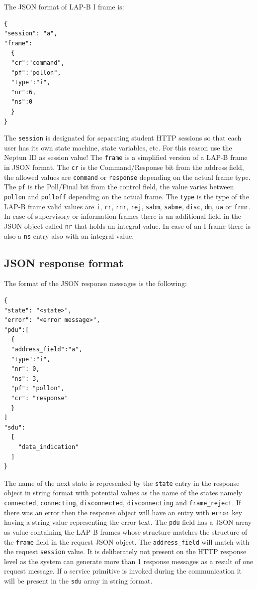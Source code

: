 \documentclass[a4paper]{article}
\begin{document}
The JSON format of LAP-B I frame is:
\begin{verbatim}
{
"session": "a", 
"frame": 
  {
  "cr":"command",
  "pf":"pollon",
  "type":"i",
  "nr":6,
  "ns":0
  }
}
\end{verbatim}

The \verb!session! is designated for separating student HTTP sessions so that each user has its own state
machine, state variables, etc. For this reason use the Neptun ID as session value!  The \verb!frame! is
a simplified version of a LAP-B
frame in JSON format. The \verb!cr! is the Command/Response bit from the address field, the allowed
values are \verb!command! or \verb!response! depending on the actual frame type. The
\verb!pf! is the Poll/Final bit from the control field, the value varies between
\verb!pollon! and \verb!polloff! depending on the actual frame. The
\verb!type! is the type of the LAP-B frame valid values are \verb!i!,
\verb!rr!, \verb!rnr!, \verb!rej!,
\verb!sabm!, \verb!sabme!, \verb!disc!, \verb!dm!,
\verb!ua! or
\verb!frmr!. In case of supervisory or information frames there is an additional field in the JSON
object called \verb!nr! that holds an integral value.
In case of an I frame there is also a \verb!ns! entry also with an integral value.

\subsection{JSON response format}

The format of the JSON response messages is the following:
\begin{verbatim}
{
"state": "<state>",
"error": "<error message>",
"pdu":[
  {
  "address_field":"a",
  "type":"i",
  "nr": 0,
  "ns": 3,
  "pf": "pollon",
  "cr": "response"
  }
]
"sdu":
  [
    "data_indication"
  ]
}
\end{verbatim}

The name of the next state is represented by the \verb!state! entry in the response object in string
format with potential values as the name of the states namely
\verb!connected!,
\verb!connecting!, \verb!disconnected!,
\verb!disconnecting! and \verb!frame_reject!.
If there was an error then the response object will have an entry with \verb!error! key having a string
value representing the error text.
The \verb!pdu! field has a JSON array as value containing the LAP-B frames whose structure matches
the structure of the \verb!frame! field in the request JSON object.
The \verb!address_field! will match with the request \verb!session! value. It is deliberately not
present on the HTTP response level as the system can generate more than 1 response messages as a result of one request
message. If a service primitive is invoked during the communication it will be present in the
\verb!sdu! array in string format.
\end{document}
